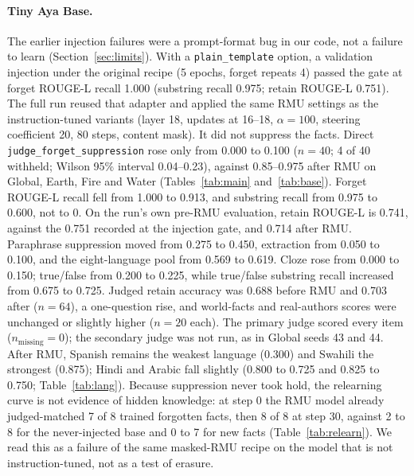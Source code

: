 \documentclass[10pt,twocolumn]{article}
\newcommand{\code}[1]{\texttt{#1}}
\newcommand{\FJ}{\code{judge\_forget\_suppression}}
\begin{document}
\paragraph{Tiny Aya Base.} The earlier injection failures were a prompt-format bug in our code, not a failure to learn (Section~\ref{sec:limits}). With a \code{plain\_template} option, a validation injection under the original recipe (5 epochs, forget repeats 4) passed the gate at forget ROUGE-L recall 1.000 (substring recall 0.975; retain ROUGE-L 0.751). The full run reused that adapter and applied the same RMU settings as the instruction-tuned variants (layer 18, updates at 16--18, $\alpha=100$, steering coefficient 20, 80 steps, content mask). It did not suppress the facts. Direct \FJ{} rose only from 0.000 to 0.100 ($n=40$; 4 of 40 withheld; Wilson 95\% interval 0.04--0.23), against 0.85--0.975 after RMU on Global, Earth, Fire and Water (Tables~\ref{tab:main} and~\ref{tab:base}). Forget ROUGE-L recall fell from 1.000 to 0.913, and substring recall from 0.975 to 0.600, not to 0. On the run's own pre-RMU evaluation, retain ROUGE-L is 0.741, against the 0.751 recorded at the injection gate, and 0.714 after RMU. Paraphrase suppression moved from 0.275 to 0.450, extraction from 0.050 to 0.100, and the eight-language pool from 0.569 to 0.619. Cloze rose from 0.000 to 0.150; true/false from 0.200 to 0.225, while true/false substring recall increased from 0.675 to 0.725. Judged retain accuracy was 0.688 before RMU and 0.703 after ($n=64$), a one-question rise, and world-facts and real-authors scores were unchanged or slightly higher ($n=20$ each). The primary judge scored every item ($n_\text{missing}=0$); the secondary judge was not run, as in Global seeds 43 and 44. After RMU, Spanish remains the weakest language (0.300) and Swahili the strongest (0.875); Hindi and Arabic fall slightly (0.800 to 0.725 and 0.825 to 0.750; Table~\ref{tab:lang}). Because suppression never took hold, the relearning curve is not evidence of hidden knowledge: at step 0 the RMU model already judged-matched 7 of 8 trained forgotten facts, then 8 of 8 at step 30, against 2 to 8 for the never-injected base and 0 to 7 for new facts (Table~\ref{tab:relearn}). We read this as a failure of the same masked-RMU recipe on the model that is not instruction-tuned, not as a test of erasure.
\end{document}

